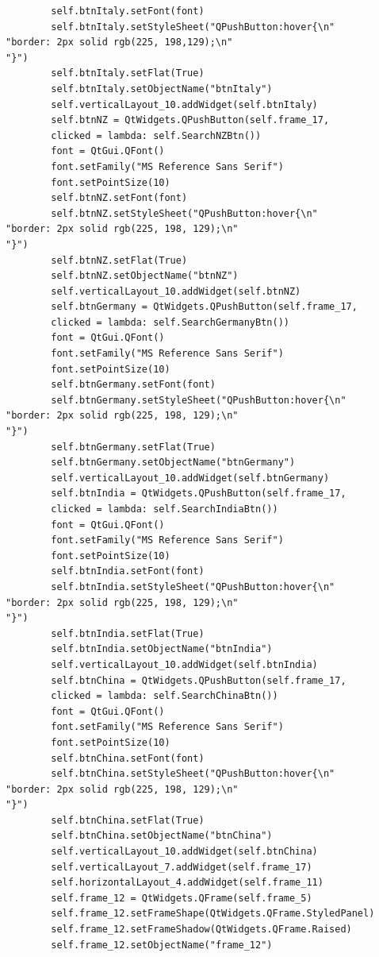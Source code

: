 \documentclass[12pt]{article}
\begin{document}
\begin{verbatim}
        self.btnItaly.setFont(font)
        self.btnItaly.setStyleSheet("QPushButton:hover{\n"
"border: 2px solid rgb(225, 198,129);\n"
"}")
        self.btnItaly.setFlat(True)
        self.btnItaly.setObjectName("btnItaly")
        self.verticalLayout_10.addWidget(self.btnItaly)
        self.btnNZ = QtWidgets.QPushButton(self.frame_17, 
        clicked = lambda: self.SearchNZBtn())
        font = QtGui.QFont()
        font.setFamily("MS Reference Sans Serif")
        font.setPointSize(10)
        self.btnNZ.setFont(font)
        self.btnNZ.setStyleSheet("QPushButton:hover{\n"
"border: 2px solid rgb(225, 198, 129);\n"
"}")
        self.btnNZ.setFlat(True)
        self.btnNZ.setObjectName("btnNZ")
        self.verticalLayout_10.addWidget(self.btnNZ)
        self.btnGermany = QtWidgets.QPushButton(self.frame_17, 
        clicked = lambda: self.SearchGermanyBtn())
        font = QtGui.QFont()
        font.setFamily("MS Reference Sans Serif")
        font.setPointSize(10)
        self.btnGermany.setFont(font)
        self.btnGermany.setStyleSheet("QPushButton:hover{\n"
"border: 2px solid rgb(225, 198, 129);\n"
"}")
        self.btnGermany.setFlat(True)
        self.btnGermany.setObjectName("btnGermany")
        self.verticalLayout_10.addWidget(self.btnGermany)
        self.btnIndia = QtWidgets.QPushButton(self.frame_17, 
        clicked = lambda: self.SearchIndiaBtn())
        font = QtGui.QFont()
        font.setFamily("MS Reference Sans Serif")
        font.setPointSize(10)
        self.btnIndia.setFont(font)
        self.btnIndia.setStyleSheet("QPushButton:hover{\n"
"border: 2px solid rgb(225, 198, 129);\n"
"}")
        self.btnIndia.setFlat(True)
        self.btnIndia.setObjectName("btnIndia")
        self.verticalLayout_10.addWidget(self.btnIndia)
        self.btnChina = QtWidgets.QPushButton(self.frame_17, 
        clicked = lambda: self.SearchChinaBtn())
        font = QtGui.QFont()
        font.setFamily("MS Reference Sans Serif")
        font.setPointSize(10)
        self.btnChina.setFont(font)
        self.btnChina.setStyleSheet("QPushButton:hover{\n"
"border: 2px solid rgb(225, 198, 129);\n"
"}")
        self.btnChina.setFlat(True)
        self.btnChina.setObjectName("btnChina")
        self.verticalLayout_10.addWidget(self.btnChina)
        self.verticalLayout_7.addWidget(self.frame_17)
        self.horizontalLayout_4.addWidget(self.frame_11)
        self.frame_12 = QtWidgets.QFrame(self.frame_5)
        self.frame_12.setFrameShape(QtWidgets.QFrame.StyledPanel)
        self.frame_12.setFrameShadow(QtWidgets.QFrame.Raised)
        self.frame_12.setObjectName("frame_12")

\end{verbatim}
\end{document}
